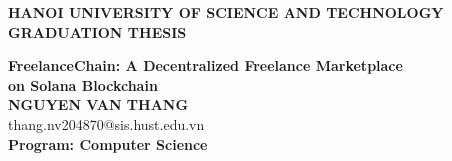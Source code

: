 \begin{titlepage}
\thispagestyle{empty}
\begin{center}

{\textbf{\large{HANOI UNIVERSITY OF SCIENCE AND TECHNOLOGY}}}\\[4cm]

{\textbf{\huge{GRADUATION THESIS}}}\\[1cm]
{\textbf{\Large{FreelanceChain: A Decentralized Freelance Marketplace\\on Solana Blockchain}}\\[1cm]

{\textbf{\large{NGUYEN VAN THANG}}}\\
{\large{thang.nv204870@sis.hust.edu.vn}}\\[0.5cm]

{\textbf{\large{Program: Computer Science}}}\\

\vspace{4cm}
\begin{table}[H]
\centering
{}
\end{table}}
\end{center}
\end{titlepage}
